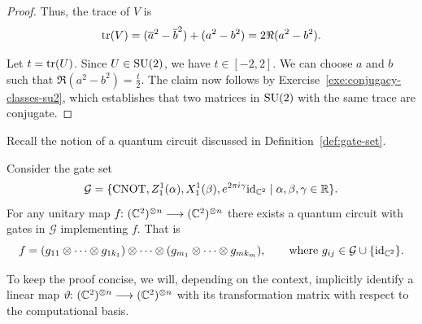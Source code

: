 \documentclass[a4paper, oneside, 12pt]{amsart}
\DeclareMathOperator{\CNOT}{CNOT}
\begin{document}
\begin{proof}
  Thus, the trace of \( V \) is
  \begin{equation*}
      \operatorname{tr}(V) = (\overline{a}^2 - \overline{b}^2) + (a^2 - b^2) = 2 \Re(a^2 - b^2).
  \end{equation*}

  Let \( t = \operatorname{tr}(U) \).
  Since \( U \in \operatorname{SU}(2) \), we have \( t \in [-2, 2] \).
  We can choose \( a \) and \( b \) such that \( \Re(a^2 - b^2) = \frac{t}{2}\).
  The claim now follows by Exercise~\ref{exe:conjugacy-classes-su2}, which establishes that two matrices in \( \operatorname{SU}(2) \) with the same trace are conjugate.
\end{proof}

Recall the notion of a quantum circuit discussed in Definition~\ref{def:gate-set}.

\begin{proposition}\label{prop:zx-calc-is-universal}
  Consider the gate set
  \begin{equation*}
    \mathcal{G}=\{\CNOT, Z_{1}^{1}(\alpha), X_{1}^{1}(\beta), e^{2\pi i \gamma} \id_{ \mathbb{C}^{2}}\mid \alpha, \beta, \gamma \in \mathbb{R}\}.
  \end{equation*}
  For any  unitary map \(f \from ( \mathbb{C}^{2})^{ \otimes n} \to ( \mathbb{C}^{2})^{\otimes n}\) there exists a quantum circuit with gates in \(\mathcal{G}\) implementing \(f\).
  That is
  \begin{equation*}
    f = (g_{11} \otimes \dots \otimes g_{1k_{1}})\otimes \dots \otimes (g_{m_{1}}\otimes \dots \otimes g_{m k_{m}}),\qquad \text{where } g_{ij} \in \mathcal{G} \cup \{\mathrm{id}_{ \mathbb{C}^{2}}\}.
  \end{equation*}
\end{proposition}

To keep the proof concise, we will, depending on the context, implicitly identify a linear map \( \vartheta \from (\mathbb{C}^2)^{\otimes n} \to (\mathbb{C}^2)^{\otimes n} \) with its transformation matrix with respect to the computational basis.
\end{document}
